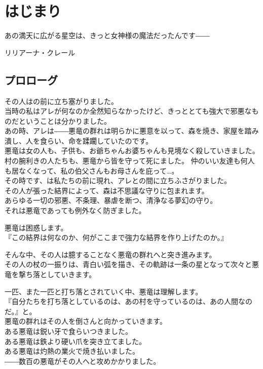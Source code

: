 \documentclass[oneside, a4paper]{jsbook}
\begin{document}
\chapter{はじまり}
\epigraph{あの満天に広がる星空は、きっと女神様の魔法だったんです――}{リリアーナ・クレール}

\section{プロローグ}

その人はの前に立ち塞がりました。\\

当時の私はアレが何なのか全然知らなかったけど、きっととても強大で邪悪なものだということは分かりました。\\
あの時、アレは――悪竜の群れは明らかに悪意を以って、森を焼き、家屋を踏み潰し、人を食らい、命を蹂躙していたのです。\\
悪竜は女の人も、子供も、お爺ちゃんお婆ちゃんも見境なく殺していきました。
村の腕利きの人たちも、悪竜から皆を守って死にました。
仲のいい友達も何人も居なくなって、私の伯父さんもお母さんを庇って\dots 。\\


その時です、は私たちの前に現れ、アレとの間に立ちふさがりました。\\
その人が張った結界によって、森は不思議な守りに包まれます。\\
あらゆる一切の邪悪、不条理、暴虐を断つ、清浄なる夢幻の守り。\\
それは悪竜であっても例外なく防ぎました。

悪竜は困惑します。\\
『この結界は何なのか、何がここまで強力な結界を作り上げたのか。』

そんな中、その人は臆することなく悪竜の群れへと突き進みます。\\
その人の杖の一振りは、青白い弧を描き、その軌跡は一条の星となって次々と悪竜を撃ち落としていきます。

一匹、また一匹と打ち落とされていく中、悪竜は理解します。\\
『自分たちを打ち落としているのは、あの村を守っているのは、あの人間なのだ。』と。\\


悪竜の群れはその人を倒さんと向かっていきます。\\
ある悪竜は鋭い牙で食らいつきました。\\
ある悪竜は鉄より硬い爪を突き立てました。\\
ある悪竜は灼熱の業火で焼き払いました。\\
――数百の悪竜がその人へと攻めかかりました。\\
\end{document}
